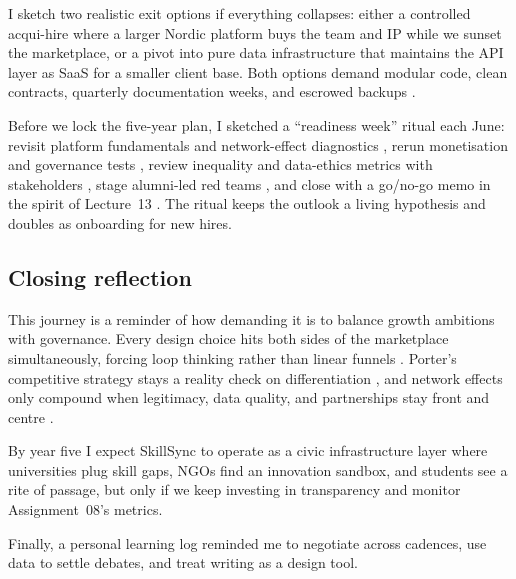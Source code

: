 I sketch two realistic exit options if everything collapses: either a controlled acqui-hire where a larger Nordic platform buys the team and IP while we sunset the marketplace, or a pivot into pure data infrastructure that maintains the API layer as SaaS for a smaller client base. Both options demand modular code, clean contracts, quarterly documentation weeks, and escrowed backups \citep{Reillier2017}.

Before we lock the five-year plan, I sketched a ``readiness week'' ritual each June: revisit platform fundamentals and network-effect diagnostics \citep{Lecture01,Lecture02}, rerun monetisation and governance tests \citep{Lecture05,Lecture10}, review inequality and data-ethics metrics with stakeholders \citep{Lecture08,Lecture11}, stage alumni-led red teams \citep{Lecture12}, and close with a go/no-go memo in the spirit of Lecture~13 \citep{Lecture13}. The ritual keeps the outlook a living hypothesis and doubles as onboarding for new hires.

\subsection*{Closing reflection}
This journey is a reminder of how demanding it is to balance growth ambitions with governance. Every design choice hits both sides of the marketplace simultaneously, forcing loop thinking rather than linear funnels \citep{Choudary2016}. Porter’s competitive strategy stays a reality check on differentiation \citep{Porter2008}, and network effects only compound when legitimacy, data quality, and partnerships stay front and centre \citep{Srnicek2017}.

By year five I expect SkillSync to operate as a civic infrastructure layer where universities plug skill gaps, NGOs find an innovation sandbox, and students see a rite of passage, but only if we keep investing in transparency and monitor Assignment~08's metrics.

Finally, a personal learning log reminded me to negotiate across cadences, use data to settle debates, and treat writing as a design tool.

